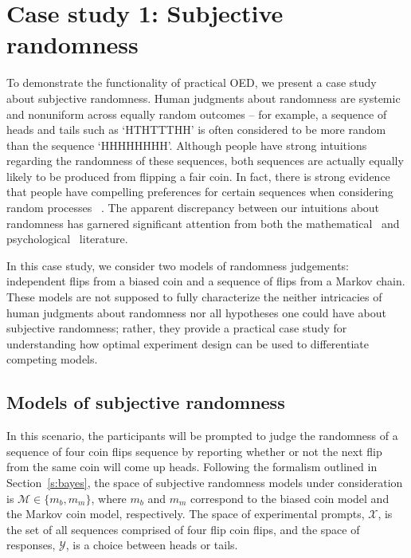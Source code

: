 \documentclass{article}
\begin{document}
\section{Case study 1: Subjective randomness}
\label{s:tutorial}

To demonstrate the functionality of practical OED, we present a case study about subjective randomness. Human judgments about randomness are systemic and nonuniform across equally random outcomes -- for example, a sequence of heads and tails such as `HTHTTTHH' is often considered to be more random than the sequence `HHHHHHHH'. Although people have strong intuitions regarding the randomness of these sequences, both sequences are actually equally likely to be produced from flipping a fair coin. In fact, there is strong evidence that people have compelling preferences for certain sequences when considering random processes ~\cite{goodfellow38:jep}. The apparent discrepancy between our intuitions about randomness has garnered significant attention from both the mathematical~\cite{chaitin01:er, kac83:as, li97:kca} and psychological~\cite{falk81:pme, lopes82:jep, griffiths01:cogsci} literature. 

In this case study, we consider two models of randomness judgements: independent flips from a biased coin and a sequence of flips from a Markov chain. These models are not supposed to fully characterize the neither intricacies of human judgments about randomness nor all hypotheses one could have about subjective randomness; rather, they provide a practical case study for understanding how optimal experiment design can be used to differentiate competing models. 

\subsection{Models of subjective randomness}
\label{s:tutorial:ss:randomness}

In this scenario, the participants will be prompted to judge the randomness of a sequence of four coin flips sequence by reporting whether or not the next flip from the same coin will come up heads. Following the formalism outlined in Section~\ref{s:bayes}, the space of subjective randomness models under consideration is $\mathcal{M} \in \{m_b, m_m\}$, where $m_b$ and $m_m$ correspond to the biased coin model and the Markov coin model, respectively. The space of experimental prompts, $\mathcal{X}$, is the set of all sequences comprised of four flip coin flips, and the space of responses, $\mathcal{Y}$, is a choice between heads or tails.
\end{document}
